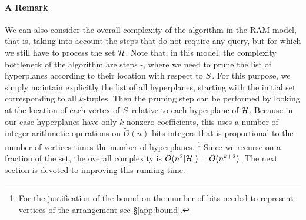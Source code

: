 \paragraph{A Remark}
We can also consider the overall complexity of the algorithm in the RAM model,
that is, taking into account the steps that do not require any query, but for
which we still have to process the set $\mathcal{H}$. Note that, in this model,
the complexity bottleneck of the algorithm are steps -,
where we need to prune
the list of hyperplanes according to their location with respect to
$S$. For this purpose, we simply maintain explicitly the list of all
hyperplanes, starting with the initial set corresponding to all $k$-tuples.
Then the pruning step can be performed by looking at the location of each
vertex of $S$ relative to each hyperplane of $\mathcal{H}$.
Because in our case hyperplanes have only $k$ nonzero coefficients, this uses a
number of integer arithmetic operations on $\tilde{O}(n)$ bits integers that is
proportional to the number of vertices times the number of hyperplanes.%
\footnote{%
For the justification of the bound on the number of bits needed to represent
vertices of the arrangement see \S\ref{app:bound}.%
}
Since we recurse on a fraction of the set, the overall complexity is
$\tilde{O}(n^2|{\mathcal{H}}|) = \tilde{O}(n^{k+2})$. The next section is devoted
to improving this running time.


